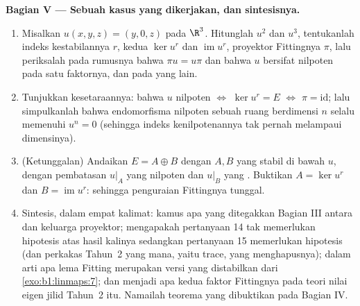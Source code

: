 \begin{problem}
\medskip
\noindent\textbf{Bagian V --- Sebuah kasus yang dikerjakan, dan sintesisnya.}
\begin{enumerate}[resume]
  \item Misalkan $u(x, y, z) = (y, 0, z)$ pada $\R^3$. Hitunglah $u^2$ dan
        $u^3$, tentukanlah indeks kestabilannya $r$, kedua
         $\ker u^{r}$ dan $\operatorname{im} u^{r}$,
        proyektor Fittingnya $\pi$, lalu periksalah pada rumusnya bahwa
        $\pi u = u\pi$ dan bahwa $u$ bersifat nilpoten pada satu faktornya,
        dan  pada yang lain.
  \item Tunjukkan kesetaraannya: bahwa $u$ nilpoten $\iff$ $\ker u^{r} =
        E$ $\iff$ $\pi = \mathrm{id}$; lalu simpulkanlah bahwa
        endomorfisma nilpoten sebuah ruang berdimensi $n$
        selalu memenuhi $u^{n} = 0$ (sehingga indeks kenilpotenannya tak pernah
        melampaui dimensinya).
  \item (Ketunggalan) Andaikan $E = A \oplus B$ dengan $A, B$ yang stabil
        di bawah $u$, dengan pembatasan $u|_A$ yang nilpoten dan $u|_B$ yang
        . Buktikan $A = \ker u^{r}$ dan $B =
        \operatorname{im} u^{r}$: sehingga penguraian Fittingnya
        tunggal.
  \item Sintesis, dalam empat kalimat: kamus apa yang ditegakkan Bagian III
        antara  dan keluarga
        proyektor; mengapakah pertanyaan 14 tak memerlukan hipotesis atas hasil kalinya
        sedangkan pertanyaan 15 memerlukan hipotesis 
        (dan perkakas Tahun~2 yang mana, yaitu trace, yang menghapusnya); dalam
        arti apa lema Fitting merupakan versi yang distabilkan dari
        \cref{exo:b1:linmaps:7}; dan menjadi apa kedua faktor Fittingnya
        pada teori nilai eigen jilid Tahun~2
        itu. Namailah teorema yang dibuktikan pada Bagian IV.

\end{enumerate}
\end{problem}
